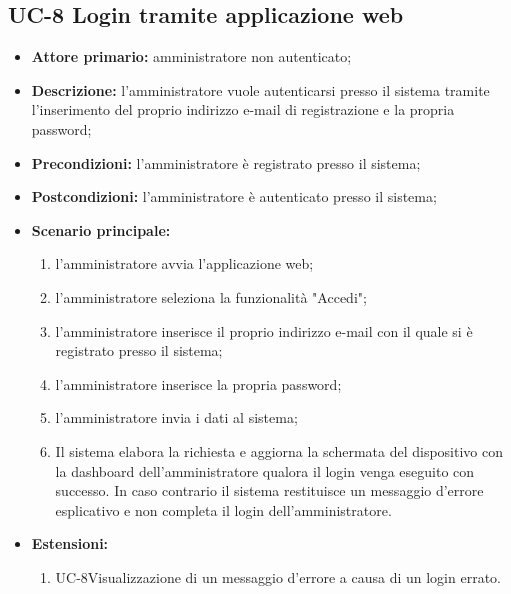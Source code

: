 \subsection{UC-8 Login tramite applicazione web}
\begin{itemize}
	\item \textbf{Attore primario:} amministratore non autenticato;

	\item \textbf{Descrizione:} l'amministratore vuole autenticarsi presso il sistema tramite l'inserimento del proprio indirizzo e-mail di registrazione e la propria password;

	\item \textbf{Precondizioni:} l'amministratore è registrato presso il sistema;

	\item \textbf{Postcondizioni:} l'amministratore è autenticato presso il sistema;

	\item \textbf{Scenario principale:} 

	\begin{enumerate}
   		 \item l'amministratore avvia l'applicazione web;
    	 \item l'amministratore seleziona la funzionalità "Accedi";
   		 \item l'amministratore inserisce il proprio indirizzo e-mail con il quale si è registrato presso il sistema;
    	 \item l'amministratore inserisce la propria password;
    	 \item l'amministratore invia i dati al sistema;
   		 \item Il sistema elabora la richiesta e aggiorna la schermata del dispositivo con la dashboard dell'amministratore qualora il login venga eseguito con successo. In caso contrario il sistema restituisce un messaggio d'errore esplicativo e non completa il login dell'amministratore.
	\end{enumerate}
	\item \textbf{Estensioni:}
	\begin{enumerate}
    	\item UC-8Visualizzazione di un messaggio d'errore a causa di un login errato.
	\end{enumerate}
\end{itemize}
